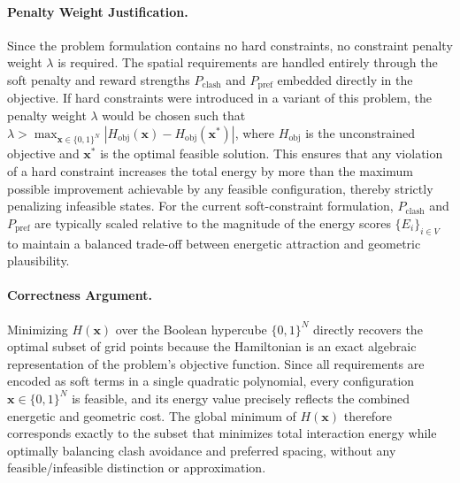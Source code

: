 \documentclass[12pt]{article}
\begin{document}
\paragraph{Penalty Weight Justification.}
Since the problem formulation contains no hard constraints, no constraint penalty weight $\lambda$ is required. The spatial requirements are handled entirely through the soft penalty and reward strengths $P_{\text{clash}}$ and $P_{\text{pref}}$ embedded directly in the objective. If hard constraints were introduced in a variant of this problem, the penalty weight $\lambda$ would be chosen such that $\lambda > \max_{\mathbf{x} \in \{0,1\}^N} |H_{\text{obj}}(\mathbf{x}) - H_{\text{obj}}(\mathbf{x}^*)|$, where $H_{\text{obj}}$ is the unconstrained objective and $\mathbf{x}^*$ is the optimal feasible solution. This ensures that any violation of a hard constraint increases the total energy by more than the maximum possible improvement achievable by any feasible configuration, thereby strictly penalizing infeasible states. For the current soft-constraint formulation, $P_{\text{clash}}$ and $P_{\text{pref}}$ are typically scaled relative to the magnitude of the energy scores $\{E_i\}_{i \in V}$ to maintain a balanced trade-off between energetic attraction and geometric plausibility.

\paragraph{Correctness Argument.}
Minimizing $H(\mathbf{x})$ over the Boolean hypercube $\{0,1\}^N$ directly recovers the optimal subset of grid points because the Hamiltonian is an exact algebraic representation of the problem's objective function. Since all requirements are encoded as soft terms in a single quadratic polynomial, every configuration $\mathbf{x} \in \{0,1\}^N$ is feasible, and its energy value precisely reflects the combined energetic and geometric cost. The global minimum of $H(\mathbf{x})$ therefore corresponds exactly to the subset that minimizes total interaction energy while optimally balancing clash avoidance and preferred spacing, without any feasible/infeasible distinction or approximation.
\end{document}
